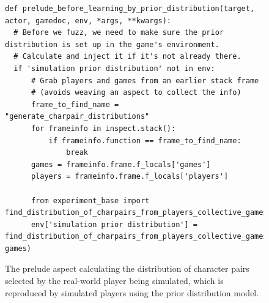 \begin{figure}[hp]
  \centering
  \begin{lstlisting}[style=custompython]
def prelude_before_learning_by_prior_distribution(target, actor, gamedoc, env, *args, **kwargs):
  # Before we fuzz, we need to make sure the prior distribution is set up in the game's environment.
  # Calculate and inject it if it's not already there.
  if 'simulation prior distribution' not in env:
      # Grab players and games from an earlier stack frame
      # (avoids weaving an aspect to collect the info)
      frame_to_find_name = "generate_charpair_distributions"
      for frameinfo in inspect.stack():
          if frameinfo.function == frame_to_find_name:
              break
      games = frameinfo.frame.f_locals['games']
      players = frameinfo.frame.f_locals['players']

      from experiment_base import find_distribution_of_charpairs_from_players_collective_games
      env['simulation prior distribution'] = find_distribution_of_charpairs_from_players_collective_games(players, games)
  \end{lstlisting}
  \caption{The prelude aspect calculating the distribution of character pairs selected by the real-world player being simulated, which is reproduced by simulated players using the prior distribution model.}
  \label{fig:prelude_before_learning_by_prior_distribution}
\end{figure}

